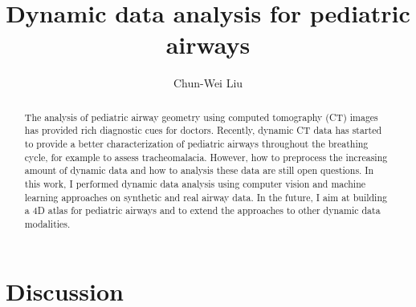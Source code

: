 \documentclass{article}
\newcommand{\mn}[1]{{\color{red}{#1}}}
\begin{document}
%
%
%
%
\title{Dynamic data analysis for pediatric airways}
%
%
\author{Chun-Wei Liu}
%
%
%


\maketitle              %

\begin{abstract}
The analysis of pediatric airway geometry using computed tomography (CT) images has provided rich diagnostic cues for doctors. Recently, dynamic CT data has started to provide a better characterization of pediatric airways throughout the breathing cycle, for example to assess tracheomalacia. However, how to preprocess the increasing amount of dynamic data and how to analysis these data are still open questions. In this work, I performed dynamic data analysis using computer vision and machine learning approaches on synthetic and real airway data. In the future, I aim at building a 4D atlas for pediatric airways and to extend the approaches to other dynamic data modalities.
\end{abstract}






\section{Discussion}
\label{sec:discussion}

\mn{TODO: you need to add a discussion and future work. This is very important.}



\end{document}
